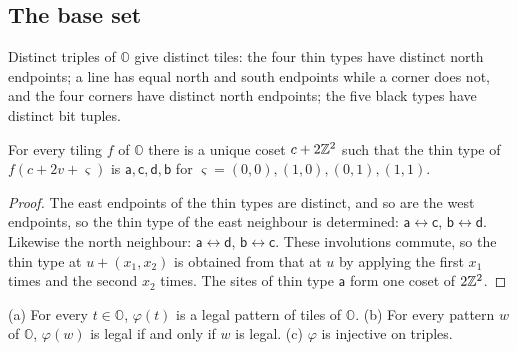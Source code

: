 \subsection{The base set}

Distinct triples of $\mathbb O$ give distinct tiles: the four thin types have distinct north endpoints; a line has equal north and south endpoints while a corner does not, and the four corners have distinct north endpoints; the five black types have distinct bit tuples.

\begin{lemma}\label{app:thin}
For every tiling $f$ of $\mathbb O$ there is a unique coset $c+2\mathbb{Z}^2$ such that the thin type of $f(c+2v+\varsigma)$ is $\mathsf a,\mathsf c,\mathsf d,\mathsf b$ for $\varsigma=(0,0),(1,0),(0,1),(1,1)$.
\end{lemma}

\begin{proof}
The east endpoints of the thin types are distinct, and so are the west endpoints, so the thin type of the east neighbour is determined: $\mathsf a\leftrightarrow\mathsf c$, $\mathsf b\leftrightarrow\mathsf d$. Likewise the north neighbour: $\mathsf a\leftrightarrow\mathsf d$, $\mathsf b\leftrightarrow\mathsf c$. These involutions commute, so the thin type at $u+(x_1,x_2)$ is obtained from that at $u$ by applying the first $x_1$ times and the second $x_2$ times. The sites of thin type $\mathsf a$ form one coset of $2\mathbb{Z}^2$.
\end{proof}

\begin{lemma}\label{app:sound}
(a) For every $t\in\mathbb O$, $\varphi(t)$ is a legal pattern of tiles of $\mathbb O$. (b) For every pattern $w$ of $\mathbb O$, $\varphi(w)$ is legal if and only if $w$ is legal. (c) $\varphi$ is injective on triples.
\end{lemma}


